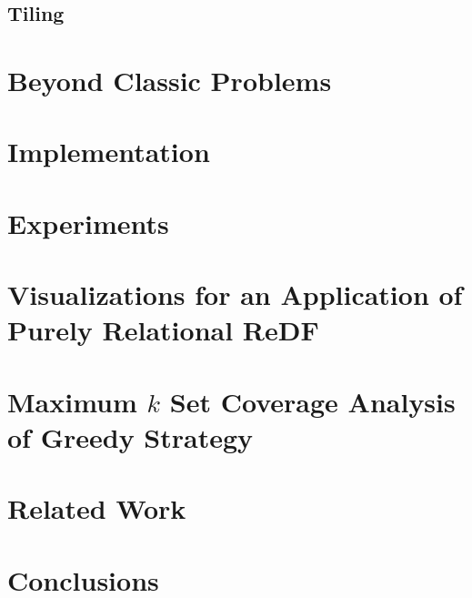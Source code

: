 \subsection{Tiling}
\label{subsection:tiling}

\section{Beyond Classic Problems}
\label{subsection:beoynd}


\section{Implementation}
\label{section:implementation}


\section{Experiments}
\label{section:experiments}




\section{Visualizations for an Application of Purely Relational ReDF}\label{appendix:application_purel_relational}

\section{Maximum $k$ Set Coverage Analysis of Greedy Strategy}\label{appendix:k_set_coverage_analysis}


\section{Related Work}
\label{section:related_work}

\section{Conclusions}
\label{section:discussion}


\cleardoublepage

